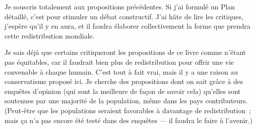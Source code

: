 \documentclass[a5paper,french,openany]{memoir}
\begin{document}
Je souscris totalement aux propositions précédentes. Si j'ai formulé un Plan détaillé, c'est pour stimuler un débat constructif. J'ai hâte de lire les critiques, j'espère qu'il y en aura, et il faudra élaborer collectivement la forme que prendra cette redistribution mondiale. 

Je sais déjà que certains critiqueront les propositions de ce livre comme n'étant pas équitables, car il faudrait bien plus de redistribution pour offrir une vie convenable %
à chaque humain. C'est tout à fait vrai, mais il y a une raison au conservatisme proposé ici. 
Je cherche des propositions dont on sait grâce à des enquêtes d'opinion (qui sont la meilleure de façon de savoir cela) qu'elles sont soutenues par une majorité de la population, même dans les pays contributeurs. (Peut-être que les populations seraient favorables à davantage de redistribution~; mais ça n'a pas encore été testé dans des enquêtes --- il faudra le faire à l'avenir.) %
\end{document}

